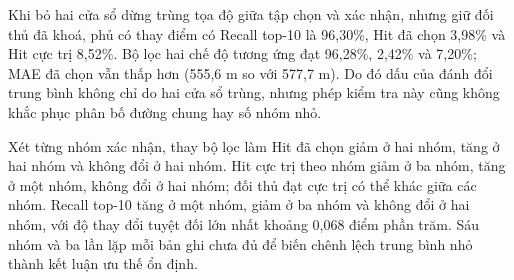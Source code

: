 Khi bỏ hai cửa sổ dừng trùng tọa độ giữa tập chọn và xác nhận, nhưng giữ đối thủ đã khoá, phủ có thay điểm có Recall top-10 là 96,30\%, Hit đã chọn 3,98\% và Hit cực trị 8,52\%. Bộ lọc hai chế độ tương ứng đạt 96,28\%, 2,42\% và 7,20\%; MAE đã chọn vẫn thấp hơn (555,6 m so với 577,7 m). Do đó dấu của đánh đổi trung bình không chỉ do hai cửa sổ trùng, nhưng phép kiểm tra này cũng không khắc phục phân bố đường chung hay số nhóm nhỏ.

Xét từng nhóm xác nhận, thay bộ lọc làm Hit đã chọn giảm ở hai nhóm, tăng ở hai nhóm và không đổi ở hai nhóm. Hit cực trị theo nhóm giảm ở ba nhóm, tăng ở một nhóm, không đổi ở hai nhóm; đối thủ đạt cực trị có thể khác giữa các nhóm. Recall top-10 tăng ở một nhóm, giảm ở ba nhóm và không đổi ở hai nhóm, với độ thay đổi tuyệt đối lớn nhất khoảng 0,068 điểm phần trăm. Sáu nhóm và ba lần lặp mỗi bản ghi chưa đủ để biến chênh lệch trung bình nhỏ thành kết luận ưu thế ổn định.
